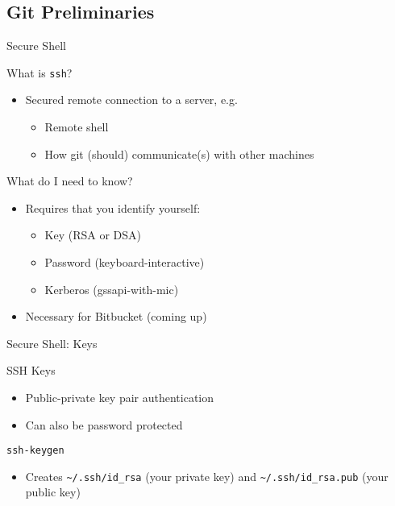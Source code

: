 \documentclass[table,dvipsnames]{beamer}
\begin{document}
\subsection{Git Preliminaries}
\frame{\subsectionpage}
\begin{frame}{Secure Shell}
	\begin{block}{What is \texttt{ssh}?}
		\begin{itemize}
			\item Secured remote connection to a server, e.g.
				\begin{itemize}
					\item Remote shell
					\item How git (should) communicate(s) with other machines 
				\end{itemize}
		\end{itemize}
	\end{block}
	\begin{block}{What do I need to know?}
		\begin{itemize}
			\item Requires that you identify yourself:
				\begin{itemize}
					\item Key (RSA or DSA)
					\item Password (keyboard-interactive)
					\item Kerberos (gssapi-with-mic)
				\end{itemize}
			\item Necessary for Bitbucket (coming up)
		\end{itemize}
	\end{block}
\end{frame}

\begin{frame}{Secure Shell: Keys}
	\begin{block}{SSH Keys}
		\begin{itemize}
			\item Public-private key pair authentication
			\item Can also be password protected
		\end{itemize}
	\end{block}
	\begin{block}{\texttt{ssh-keygen}}
		\begin{itemize}
			\item Creates \texttt{\~{}/.ssh/id\_rsa} (your private key) and
				\texttt{\~{}/.ssh/id\_rsa.pub} (your public key)
		\end{itemize}
	\end{block}
\end{frame}
\end{document}
